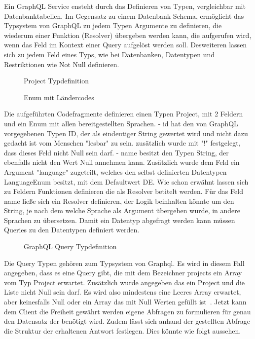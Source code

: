 Ein GraphQL Service ensteht durch das Definieren von Typen, vergleichbar mit Datenbanktabellen. Im Gegensatz zu einem Datenbank Schema,
ermöglicht das Typsystem von GraphQL zu jedem Typen Argumente zu definieren, die wiederum einer Funktion (Resolver) übergeben werden kann, die aufgerufen wird, wenn das Feld
im Kontext einer Query aufgelöst werden soll. Desweiteren lassen sich zu jedem Feld eines Typs, wie bei Datenbanken, Datentypen und Restriktionen wie Not Null definieren.

\begin{figure}[h]
    
    \caption{Project Typdefinition}
    \label{fig:basics:graphql:1}
\end{figure}

\begin{figure}[h]
    
    \caption{Enum mit Ländercodes}
    \label{fig:basics:graphql:2}
\end{figure}

Die aufgeführten Codefragmente definieren einen Typen Project, mit 2 Feldern und ein Enum mit allen bereitgestellten Sprachen.
- id hat den von GraphQL vorgegebenen Typen ID, der als eindeutiger String gewertet wird und nicht dazu gedacht ist vom Menschen "lesbar" zu sein.
zusätzlich wurde mit "!" festgelegt, dass dieses Feld nicht Null sein darf.
- name besitzt den Typen String, der ebenfalls nicht den Wert Null annehmen kann. Zusätzlich wurde dem Feld ein Argument "language" zugeteilt,
welches den selbst definierten Datentypen LanguageEnum besitzt, mit dem Defaultwert DE.
Wie schon erwähnt lassen sich zu Feldern Funktionen definieren die als Resolver betitelt werden.
Für das Feld name ließe sich ein Resolver definieren, der Logik beinhalten könnte um den String, je nach dem welche Sprache als Argument übergeben wurde,
in andere Sprachen zu übersetzen.
Damit ein Datentyp abgefragt werden kann müssen Queries zu den Datentypen definiert werden.

\begin{figure}[h]
    
    \caption{GraphQL Query Typdefinition}
    \label{fig:basics:graphql:3}
\end{figure}

Die Query Typen gehören zum Typsystem von Graphql. Es wird in diesem Fall angegeben, dass es eine Query gibt, die mit dem Bezeichner projects
ein Array vom Typ Project erwartet. Zusätzlich wurde angegeben das ein Project und die Liste nicht Null sein darf.
Es wird also mindestens eine Leeres Array erwartet, aber keinesfalls Null oder ein Array das mit Null Werten gefüllt ist~\cite{graphql}.
Jetzt kann dem Client die Freiheit gewährt werden eigene Abfragen zu formulieren für genau den Datensatz der benötigt wird.
Zudem lässt sich anhand der gestellten Abfrage die Struktur der erhaltenen Antwort festlegen. Dies könnte wie folgt aussehen.

